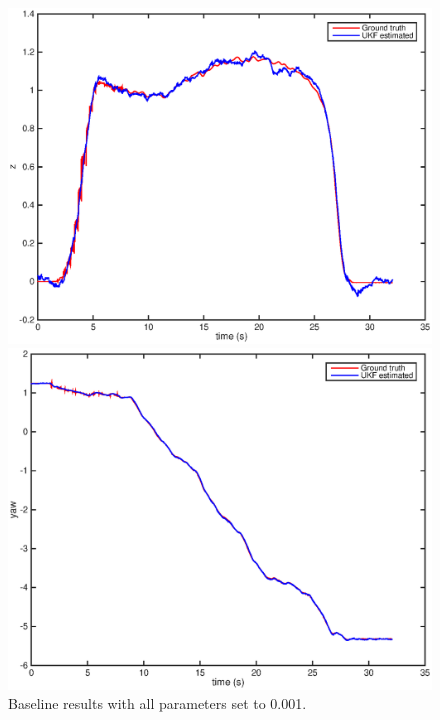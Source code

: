 \documentclass[letter, 10pt]{article}
\begin{document}
\begin{onehalfspacing}
\begin{figure}[h]
\begin{minipage}{.25\textwidth}
	\end{minipage}%
	\begin{minipage}{.25\textwidth}  		
		\centering
    		\includegraphics[width=1\linewidth]{b_z.eps}
	\end{minipage}%
	\begin{minipage}{.25\textwidth}  
		\centering
    		\includegraphics[width=1\linewidth]{b_yaw.eps}
	\end{minipage}
	\centering
	\caption{Baseline results with all parameters set to 0.001.}
	\label{baseline}
\end{figure}


\end{onehalfspacing}
\end{document}

